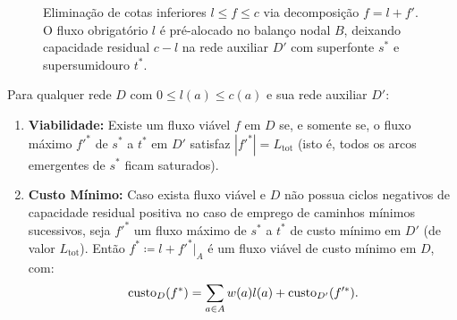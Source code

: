 \begin{figure}[!ht]
\centering
{}
\caption{Eliminação de cotas inferiores $l \le f \le c$ via decomposição $f = l + f'$. O fluxo obrigatório $l$ é pré-alocado no balanço nodal $B$, deixando capacidade residual $c - l$ na rede auxiliar $D'$ com superfonte $s^*$ e supersumidouro $t^*$.}
\label{fig:cotas_inferiores}
\end{figure}

\begin{teorema}
Para qualquer rede $D$ com $0 \le l(a) \le c(a)$ e sua rede auxiliar $D'$:
\begin{enumerate}
    \item \textbf{Viabilidade:} Existe um fluxo viável $f$ em $D$ se, e somente se, o fluxo máximo $f'^*$ de $s^*$ a $t^*$ em $D'$ satisfaz $|f'^*| = L_{\text{tot}}$ (isto é, todos os arcos emergentes de $s^*$ ficam saturados).
    \item \textbf{Custo Mínimo:} Caso exista fluxo viável e $D$ não possua ciclos negativos de capacidade residual positiva no caso de emprego de caminhos mínimos sucessivos, seja $f'^*$ um fluxo máximo de $s^*$ a $t^*$ de custo mínimo em $D'$ (de valor $L_{\text{tot}}$). Então $f^* \coloneqq l + f'^*|_A$ é um fluxo viável de custo mínimo em $D$, com:
    \begin{equation}
        \operatorname{custo}_D(f^*) = \sum_{a \in A} w(a) l(a) + \operatorname{custo}_{D'}(f'^*).
    \end{equation}
\end{enumerate}
\end{teorema}

